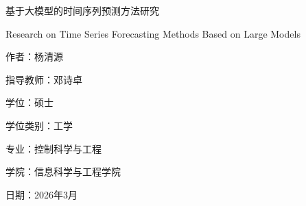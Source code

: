 

\begin{center}
{\LARGE 基于大模型的时间序列预测方法研究\par}
\vspace{1em}
{\large Research on Time Series Forecasting Methods Based on Large Models\par}
\vspace{2em}
作者：杨清源\par
指导教师：邓诗卓\par
学位：硕士\par
学位类别：工学\par
专业：控制科学与工程\par
学院：信息科学与工程学院\par
日期：2026年3月\par
\end{center}

\newpage




